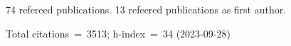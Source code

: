 74 refereed publications. 13 refeered publications as first author.

Total citations~=~3513; h-index~=~34 (2023-09-28)